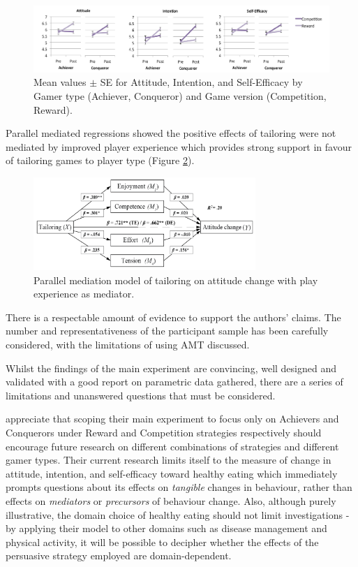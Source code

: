\documentclass[11pt]{article}
\begin{document}
\begin{figure}[H]
\centering
\includegraphics[width=\textwidth]{img/orji2017-tailoring-results.png} 
\caption{Mean values $\pm$ SE for Attitude, Intention, and Self-Efficacy by Gamer type (Achiever, Conqueror) and Game version (Competition, Reward).}\label{fig:orji2017-tailoring-results}
\end{figure}

Parallel mediated regressions \citep{hayes2013} showed the positive effects of tailoring were not mediated by improved player experience which provides strong support in favour of tailoring games to player type (Figure \ref{fig:orji2017-tailoring-mediation-results}). 

\begin{figure}[H]
\centering
\includegraphics[width=0.75\textwidth]{img/orji2017-tailoring-mediation-results.png} 
\caption{Parallel mediation model of tailoring on attitude change with play experience as mediator.}\label{fig:orji2017-tailoring-mediation-results}
\end{figure}

There is a respectable amount of evidence to support the authors' claims. The number and representativeness of the participant sample has been carefully considered, with the limitations of using AMT discussed.

Whilst the findings of the main experiment are convincing, well designed and validated with a good report on parametric data gathered, there are a series of limitations and unanswered questions that must be considered.

\citeauthor{orji2017} appreciate that scoping their main experiment to focus only on Achievers and Conquerors under Reward and Competition strategies respectively should encourage future research on different combinations of strategies and different gamer types. Their current research limits itself to the measure of change in attitude, intention, and self-efficacy toward healthy eating which immediately prompts questions about its effects on \textit{tangible} changes in behaviour, rather than effects on \textit{mediators} or \textit{precursors} of behaviour change. Also, although purely illustrative, the domain choice of healthy eating should not limit investigations - by applying their model to other domains such as disease management and physical activity, it will be possible to decipher whether the effects of the persuasive strategy employed are domain-dependent.  
\end{document}
